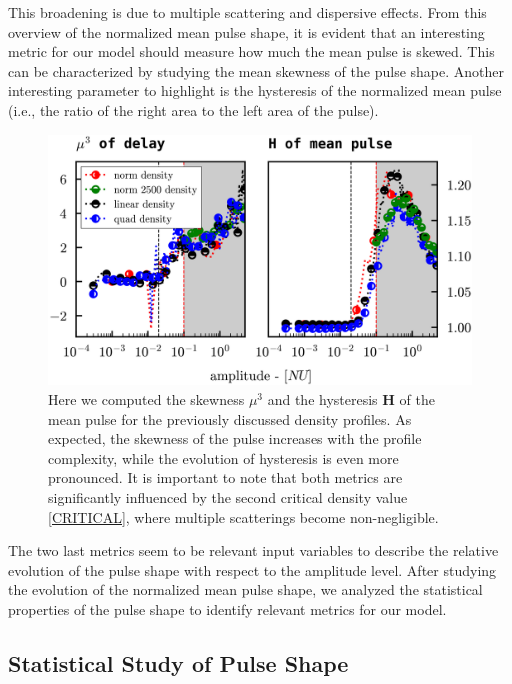 \documentclass[11pt,a4paper,openany]{report}
\begin{document}
\begin{multicols}{2}
    This broadening is due to multiple scattering and dispersive effects. From this overview of the normalized mean pulse shape, it is evident that an interesting metric for our model should measure how much the mean pulse is skewed. This can be characterized by studying the mean skewness of the pulse shape. Another interesting parameter to highlight is the hysteresis of the normalized mean pulse (i.e., the ratio of the right area to the left area of the pulse).
    \begin{figure}[H]
        \centering
        \includegraphics[width=1\linewidth]{./figures/skew_Hyst.png}
        \caption{Here we computed the skewness $\mu^3$ and the hysteresis \textbf{H} of the mean pulse for the previously discussed density profiles. As expected, the skewness of the pulse increases with the profile complexity, while the evolution of hysteresis is even more pronounced. It is important to note that both metrics are significantly influenced by the second critical density value \ref{CRITICAL}, where multiple scatterings become non-negligible.}
        \label{}
    \end{figure}
    The two last metrics seem to be relevant input variables to describe the relative evolution of the pulse shape with respect to the amplitude level. After studying the evolution of the normalized mean pulse shape, we analyzed the statistical properties of the pulse shape to identify relevant metrics for our model.
    \subsection{Statistical Study of Pulse Shape}





\end{multicols}
\end{document}
